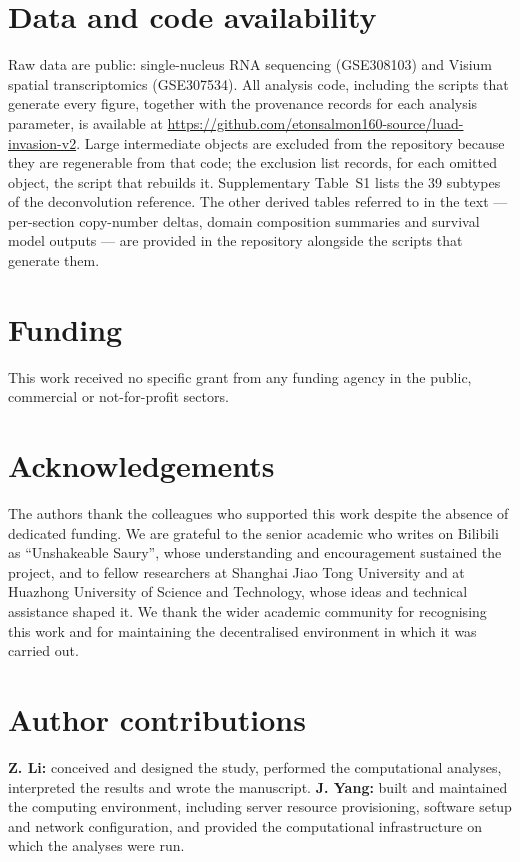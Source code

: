 \section*{Data and code availability}
Raw data are public: single-nucleus RNA sequencing (GSE308103) and Visium spatial
transcriptomics (GSE307534). All analysis code, including the scripts that generate every
figure, together with the provenance records for each analysis parameter, is available at
\url{https://github.com/etonsalmon160-source/luad-invasion-v2}. Large intermediate objects
are excluded from the repository because they are regenerable from that code; the exclusion
list records, for each omitted object, the script that rebuilds it.
Supplementary Table~S1 lists the 39 subtypes of the deconvolution reference. The other
derived tables referred to in the text --- per-section copy-number deltas, domain
composition summaries and survival model outputs --- are provided in the repository
alongside the scripts that generate them.

\section*{Funding}
This work received no specific grant from any funding agency in the public, commercial or
not-for-profit sectors.

\section*{Acknowledgements}
The authors thank the colleagues who supported this work despite the absence of dedicated
funding. We are grateful to the senior academic who writes on Bilibili as ``Unshakeable
Saury'', whose understanding and encouragement sustained the project, and to fellow
researchers at Shanghai Jiao Tong University and at Huazhong University of Science and
Technology, whose ideas and technical assistance shaped it. We thank the wider academic
community for recognising this work and for maintaining the decentralised environment in
which it was carried out.

\section*{Author contributions}
\textbf{Z. Li:} conceived and designed the study, performed the computational analyses,
interpreted the results and wrote the manuscript. \textbf{J. Yang:} built and maintained
the computing environment, including server resource provisioning, software setup and
network configuration, and provided the computational infrastructure on which the analyses
were run.

